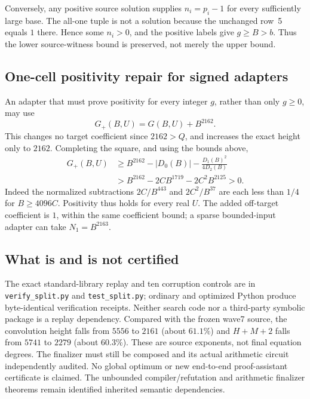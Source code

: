 Conversely, any positive source solution supplies $n_i=p_i-1$ for every
sufficiently large base.  The all-one tuple is not a solution because the
unchanged row~5 equals $1$ there.  Hence some $n_i>0$, and the positive
labels give $g\ge B>b$.  Thus the lower source-witness bound is preserved,
not merely the upper bound.

\subsection{One-cell positivity repair for signed adapters}
An adapter that must prove positivity for every integer $g$, rather than
only $g\ge0$, may use
\[
 G_+(B,U)=G(B,U)+B^{2162}.
\]
This changes no target coefficient since $2162>Q$, and increases the exact
height only to $2162$.  Completing the square, and using the bounds above,
\begin{align*}
 G_+(B,U)
 &\ge B^{2162}-|D_0(B)|-\frac{D_1(B)^2}{4D_2(B)}\\
 &>B^{2162}-2CB^{1719}-2C^2B^{2125}>0.
\end{align*}
Indeed the normalized subtractions $2C/B^{443}$ and $2C^2/B^{37}$ are each
less than $1/4$ for $B\ge4096C$.  Positivity thus holds for every real $U$.
The added off-target coefficient is $1$, within the same coefficient bound;
a sparse bounded-input adapter can take $N_1=B^{2163}$.

\subsection{What is and is not certified}
The exact standard-library replay and ten corruption controls are in
\texttt{verify\_split.py} and \texttt{test\_split.py}; ordinary and optimized
Python produce byte-identical verification receipts.  Neither search code
nor a third-party symbolic package is a replay dependency.
Compared with the frozen wave7 source, the convolution height falls from
$5556$ to $2161$ (about $61.1\%$) and $H+M+2$ falls from $5741$ to $2279$
(about $60.3\%$).  These are source exponents, not final equation degrees.
The finalizer must still be composed and its actual arithmetic circuit
independently audited.  No global optimum or new end-to-end proof-assistant
certificate is claimed.  The unbounded compiler/refutation and arithmetic
finalizer theorems remain identified inherited semantic dependencies.
